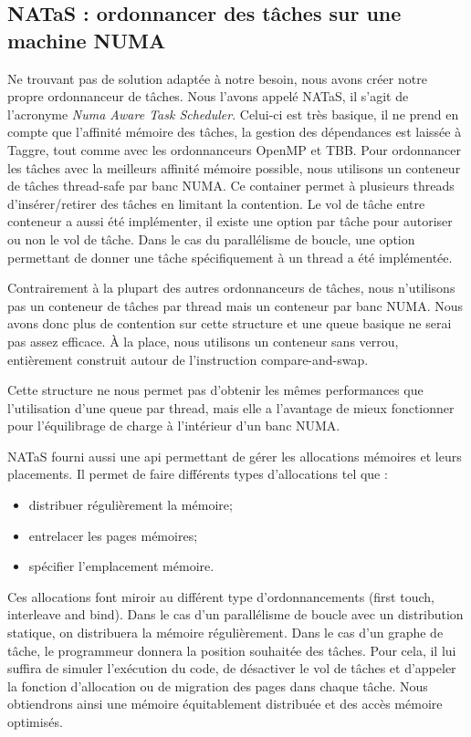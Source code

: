 \subsection{NATaS : ordonnancer des tâches sur une machine NUMA}
Ne trouvant pas de solution adaptée à notre besoin, nous avons créer notre propre ordonnanceur de tâches.
%
Nous l'avons appelé NATaS, il s'agit de l'acronyme {\em Numa Aware Task Scheduler}.
%
Celui-ci est très basique, il ne prend en compte que l'affinité mémoire des tâches, la gestion des dépendances est laissée à Taggre, tout comme avec les ordonnanceurs OpenMP et TBB.
%
Pour ordonnancer les tâches avec la meilleurs affinité mémoire possible, nous utilisons un conteneur de tâches thread-safe par banc NUMA.
%
Ce container permet à plusieurs threads d'insérer/retirer des tâches en limitant la contention.
%
Le vol de tâche entre conteneur a aussi été implémenter, il existe une option par tâche pour autoriser ou non le vol de tâche.
%
Dans le cas du parallélisme de boucle, une option permettant de donner une tâche spécifiquement à un thread a été implémentée.


Contrairement à la plupart des autres ordonnanceurs de tâches, nous n'utilisons pas un conteneur de tâches par thread mais un conteneur par banc NUMA.
%
Nous avons donc plus de contention sur cette structure et une queue basique ne serai pas assez efficace.
%
\`A la place, nous utilisons un conteneur sans verrou, entièrement construit autour de l'instruction compare-and-swap.
%

%
Cette structure ne nous permet pas d'obtenir les mêmes performances que l'utilisation d'une queue par thread, mais elle a l'avantage de mieux fonctionner pour l'équilibrage de charge à l'intérieur d'un banc NUMA.



NATaS fourni aussi une api permettant de gérer les allocations mémoires et leurs placements.
%
Il permet de faire différents types d'allocations tel que :
\begin{itemize}
  \item distribuer régulièrement la mémoire;
  \item entrelacer les pages mémoires;
  \item spécifier l'emplacement mémoire.
\end{itemize}
%
Ces allocations font miroir au différent type d'ordonnancements (first touch, interleave and bind).
%
Dans le cas d'un parallélisme de boucle avec un distribution statique, on distribuera la mémoire régulièrement.
%
Dans le cas d'un graphe de tâche, le programmeur donnera la position souhaitée des tâches.
%
Pour cela, il lui suffira de simuler l'exécution du code, de désactiver le vol de tâches et d'appeler la fonction d'allocation ou de migration des pages dans chaque tâche.
%
Nous obtiendrons ainsi une mémoire équitablement distribuée et des accès mémoire optimisés.


